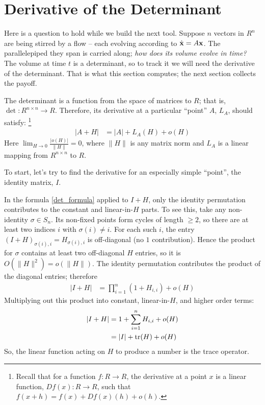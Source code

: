 \documentclass{article}
\begin{document}
\section{Derivative of the Determinant}
Here is a question to hold while we build the next tool. Suppose $n$ vectors in
$R^n$ are being stirred by a flow -- each evolving according to
$\dot{\bf x} = A {\bf x}$. The parallelepiped they span is carried along;
{\em how does its volume evolve in time?\/} The volume at time $t$ is a
determinant, so to track it we will need the derivative of the determinant.
That is what this section computes; the next section collects the payoff.

The determinant is a function from the space of matrices to $R$; that is,
$\det : R^{n \times n} \rightarrow R$.
Therefore, its derivative at a particular ``point'' $A$, $L_A$, should satisfy:%
\footnote{Recall that for a function $f: R \rightarrow R$, the derivative at a point
  $x$ is a linear function, $Df(x): R \rightarrow R$, such that
  $f(x+h) = f(x) + Df(x)(h) + o(h)$.}
\begin{align}
  |A + H| &= |A| + L_A(H) + o(H)
\end{align}
Here $\lim_{H\rightarrow 0} \frac{|o(H)|}{\|H\|}  = 0$, where $\|H\|$ is any matrix norm
and $L_A$ is a linear mapping from $R^{n \times n}$ to $R$.

To start, let's try to find the derivative for an especially simple ``point'',
the identity matrix, $I$.

In the formula \eqref{det_formula} applied to $I + H$, only the identity
permutation contributes to the constant and linear-in-$H$ parts.
To see this, take any non-identity $\sigma \in S_n$. Its non-fixed points form
cycles of length $\geq 2$, so there are at least two indices $i$ with
$\sigma(i) \neq i$. For each such $i$, the entry
$(I+H)_{\sigma(i), i} = H_{\sigma(i), i}$ is off-diagonal (no $1$ contribution).
Hence the product for $\sigma$ contains at least two off-diagonal $H$ entries,
so it is $O(\|H\|^2) = o(\|H\|)$. The identity permutation contributes the
product of the diagonal entries; therefore
\begin{align}
  |I + H| &= \prod_{i=1}^n \left(1 + H_{i,i}\right) + o(H)
\end{align}
Multiplying out this product into constant, linear-in-$H$, and higher order
terms:
\begin{align}
  |I + H| &= 1 + \sum_{i=1}^n H_{i,i} + o(H) \nonumber \\
  &= |I| + {\rm tr}(H) + o(H) \label{deriv_Ia}
\end{align}
So, the linear function acting on $H$ to produce a number is the trace operator.
\end{document}
